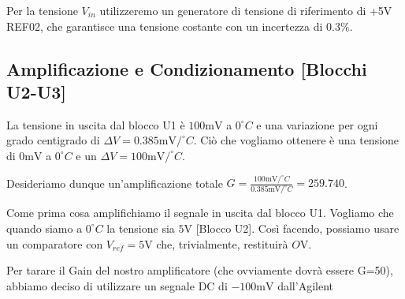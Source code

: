 Per la tensione $V_{in}$ utilizzeremo un generatore di tensione di riferimento di +5\si{\volt} REF02, che garantisce una tensione costante con un incertezza di $0.3\%$.

\subsection{Amplificazione e Condizionamento [Blocchi U2-U3]}
La tensione in uscita dal blocco U1 è $100 \si{\milli\volt}$ a $0^{\circ}C$ e una variazione per ogni grado centigrado di $\Delta V=0.385\si{\milli\volt}/^{\circ}C$. Ciò che vogliamo ottenere è una tensione di $0 \si{\milli\volt}$ a $0^{\circ}C$ e un $\Delta V=100\si{\milli\volt}/^{\circ}C$.

Desideriamo dunque un'amplificazione totale $G=\frac{100\si{\milli\volt}/^{\circ}C}{0.385\si{\milli\volt}/^{\circ}C}=259.740$. 


Come prima cosa amplifichiamo il segnale in uscita dal blocco U1. Vogliamo che quando siamo a $0^{\circ}C$ la tensione sia $5\si{\volt}$ [Blocco U2]. Così facendo, possiamo usare un comparatore con $V_{ref}=5\si{\volt}$ che, trivialmente, restituirà $O\si{\volt}$. 

Per tarare il Gain del nostro amplificatore (che ovviamente dovrà essere G=50), abbiamo deciso di utilizzare un segnale DC di $-100\si{\milli\volt}$ dall'Agilent  














